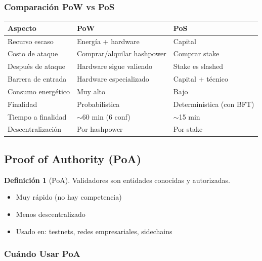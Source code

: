 \documentclass[11pt,a4paper,twoside,openright]{book}
\theoremstyle{definition}
\newtheorem{definition}{Definición}[chapter]
\theoremstyle{plain}
\theoremstyle{remark}
\begin{document}
\subsubsection{Comparación PoW vs PoS}

\begin{center}
\begin{tabular}{lll}
\toprule
\textbf{Aspecto} & \textbf{PoW} & \textbf{PoS} \\
\midrule
Recurso escaso & Energía + hardware & Capital \\
Costo de ataque & Comprar/alquilar hashpower & Comprar stake \\
Después de ataque & Hardware sigue valiendo & Stake es slashed \\
Barrera de entrada & Hardware especializado & Capital + técnico \\
Consumo energético & Muy alto & Bajo \\
Finalidad & Probabilística & Determinística (con BFT) \\
Tiempo a finalidad & $\sim$60 min (6 conf) & $\sim$15 min \\
Descentralización & Por hashpower & Por stake \\
\bottomrule
\end{tabular}
\end{center}

\subsection{Proof of Authority (PoA)}

\begin{definition}[PoA]
Validadores son entidades conocidas y autorizadas.
\end{definition}

\begin{itemize}
    \item Muy rápido (no hay competencia)
    \item Menos descentralizado
    \item Usado en: testnets, redes empresariales, sidechains
\end{itemize}

\subsubsection{Cuándo Usar PoA}
\end{document}
